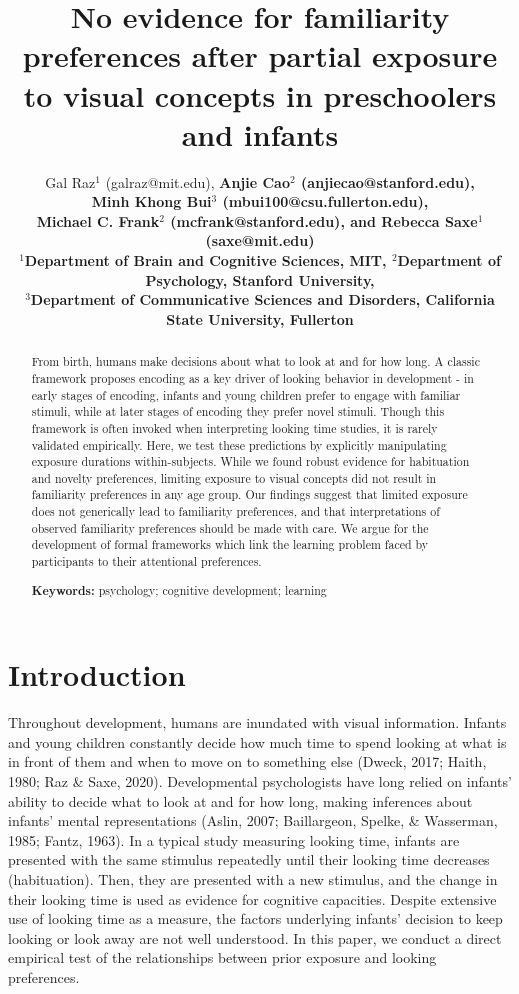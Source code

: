 \documentclass[10pt, letterpaper]{article}
\title{No evidence for familiarity preferences after partial exposure to
visual concepts in preschoolers and infants}
\author{Gal Raz$^1$ (galraz@mit.edu), \bf{Anjie Cao$^2$  (anjiecao@stanford.edu)},\\ \bf{Minh Khong Bui$^3$  (mbui100@csu.fullerton.edu)}, \\ \bf{Michael C. Frank$^2$ (mcfrank@stanford.edu)},
 and \bf{Rebecca Saxe$^1$ (saxe@mit.edu)} \\
$^1$Department of Brain and Cognitive Sciences, MIT, $^2$Department of Psychology, Stanford University, \\ $^3$Department of Communicative Sciences and Disorders, California State University, Fullerton \\ }
\begin{document}
\maketitle

\begin{abstract}
From birth, humans make decisions about what to look at and for how
long. A classic framework proposes encoding as a key driver of looking
behavior in development - in early stages of encoding, infants and young
children prefer to engage with familiar stimuli, while at later stages
of encoding they prefer novel stimuli. Though this framework is often
invoked when interpreting looking time studies, it is rarely validated
empirically. Here, we test these predictions by explicitly manipulating
exposure durations within-subjects. While we found robust evidence for
habituation and novelty preferences, limiting exposure to visual
concepts did not result in familiarity preferences in any age group. Our
findings suggest that limited exposure does not generically lead to
familiarity preferences, and that interpretations of observed
familiarity preferences should be made with care. We argue for the
development of formal frameworks which link the learning problem faced
by participants to their attentional preferences.

\textbf{Keywords:}
psychology; cognitive development; learning
\end{abstract}

\hypertarget{introduction}{%
\section{Introduction}\label{introduction}}

Throughout development, humans are inundated with visual information.
Infants and young children constantly decide how much time to spend
looking at what is in front of them and when to move on to something
else (Dweck, 2017; Haith, 1980; Raz \& Saxe, 2020). Developmental
psychologists have long relied on infants' ability to decide what to
look at and for how long, making inferences about infants' mental
representations (Aslin, 2007; Baillargeon, Spelke, \& Wasserman, 1985;
Fantz, 1963). In a typical study measuring looking time, infants are
presented with the same stimulus repeatedly until their looking time
decreases (habituation). Then, they are presented with a new stimulus,
and the change in their looking time is used as evidence for cognitive
capacities. Despite extensive use of looking time as a measure, the
factors underlying infants' decision to keep looking or look away are
not well understood. In this paper, we conduct a direct empirical test
of the relationships between prior exposure and looking preferences.
\end{document}
